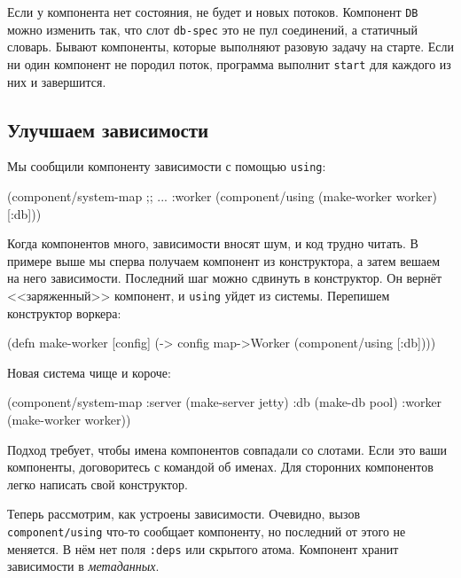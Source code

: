 Если у компонента нет состояния, не будет и новых потоков. Компонент \verb|DB|
можно изменить так, что слот \verb|db-spec| это не пул соединений, а статичный
словарь. Бывают компоненты, которые выполняют разовую задачу на старте. Если ни
один компонент не породил поток, программа выполнит \verb|start| для каждого
из них и завершится.

\subsection{Улучшаем зависимости}


Мы сообщили компоненту зависимости с помощью \verb|using|:

\begin{english}
  \begin{clojure}
(component/system-map
 ;; ...
 :worker (component/using
          (make-worker worker) [:db]))
  \end{clojure}
\end{english}

Когда компонентов много, зависимости вносят шум, и код трудно читать. В примере
выше мы сперва получаем компонент из конструктора, а затем вешаем на него
зависимости. Последний шаг можно сдвинуть в конструктор. Он вернёт
<<заряженный>> компонент, и \verb|using| уйдет из системы. Перепишем
конструктор воркера:

\begin{english}
  \begin{clojure}
(defn make-worker [config]
  (-> config
      map->Worker
      (component/using [:db])))
  \end{clojure}
\end{english}

\noindent
Новая система чище и короче:

\begin{english}
  \begin{clojure}
(component/system-map
 :server (make-server jetty)
 :db     (make-db pool)
 :worker (make-worker worker))
  \end{clojure}
\end{english}

Подход требует, чтобы имена компонентов совпадали со слотами. Если это ваши
компоненты, договоритесь с командой об именах. Для сторонних компонентов легко
написать свой конструктор.


Теперь рассмотрим, как устроены зависимости. Очевидно, вызов
\verb|component/using| что-то сообщает компоненту, но последний от этого не
меняется. В нём нет поля \verb|:deps| или скрытого атома. Компонент хранит
зависимости в \emph{метаданных}.

